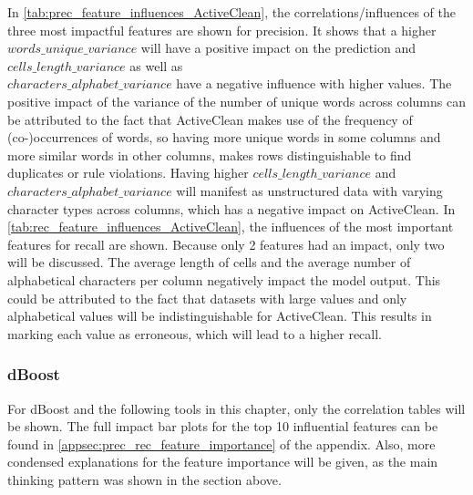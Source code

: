 In \autoref{tab:prec_feature_influences_ActiveClean}, the correlations/influences of the three most impactful features are shown for precision. It shows that a higher $words\_unique\_variance$ will have a positive impact on the prediction and $cells\_length\_variance$ as well as \\$characters\_alphabet\_variance$ have a negative influence with higher values. The positive impact of the variance of the number of unique words across columns can be attributed to the fact that ActiveClean makes use of the frequency of (co-)occurrences of words, so having more unique words in some columns and more similar words in other columns, makes rows distinguishable to find duplicates or rule violations. Having higher $cells\_length\_variance$ and $characters\_alphabet\_variance$ will manifest as unstructured data with varying character types across columns, which has a negative impact on ActiveClean.
In \autoref{tab:rec_feature_influences_ActiveClean}, the influences of the most important features for recall are shown. Because only 2 features had an impact, only two will be discussed. The average length of cells and the average number of alphabetical characters per column negatively impact the model output. This could be attributed to the fact that datasets with large values and only alphabetical values will be indistinguishable for ActiveClean. This results in marking each value as erroneous, which will lead to a higher recall. 



\subsubsection{dBoost}
\label{subsubsec:importance_dBoost}
For dBoost and the following tools in this chapter, only the correlation tables will be shown. The full impact bar plots for the top 10 influential features can be found in \autoref{appsec:prec_rec_feature_importance} of the appendix. Also, more condensed explanations for the feature importance will be given, as the main thinking pattern was shown in the section above. 


